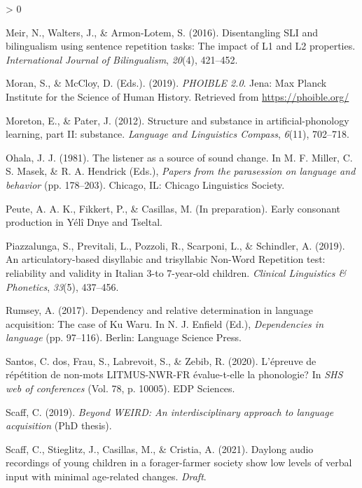 \documentclass[
  american,
  ,man,floatsintext]{apa6}
\newlength{\cslhangindent}
\newenvironment{CSLReferences}[2] %
 {%
  \setlength{\parindent}{0pt}
  \ifodd #1 \everypar{\setlength{\hangindent}{\cslhangindent}}\ignorespaces\fi
  \ifnum #2 > 0
  \setlength{\parskip}{#2\baselineskip}
  \fi
 }%
 {}
\begin{document}
\begin{CSLReferences}{1}{0}
\leavevmode\hypertarget{ref-meir2016disentangling}{}%
Meir, N., Walters, J., \& Armon-Lotem, S. (2016). {Disentangling SLI and bilingualism using sentence repetition tasks: The impact of L1 and L2 properties}. \emph{International Journal of Bilingualism}, \emph{20}(4), 421--452.

\leavevmode\hypertarget{ref-phoible}{}%
Moran, S., \& McCloy, D. (Eds.). (2019). \emph{PHOIBLE 2.0}. Jena: Max Planck Institute for the Science of Human History. Retrieved from \url{https://phoible.org/}

\leavevmode\hypertarget{ref-moreton2012structure}{}%
Moreton, E., \& Pater, J. (2012). Structure and substance in artificial-phonology learning, part {II}: substance. \emph{Language and Linguistics Compass}, \emph{6}(11), 702--718.

\leavevmode\hypertarget{ref-ohala1981listener}{}%
Ohala, J. J. (1981). The listener as a source of sound change. In M. F. Miller, C. S. Masek, \& R. A. Hendrick (Eds.), \emph{Papers from the parasession on language and behavior} (pp. 178--203). Chicago, IL: Chicago Linguistics Society.

\leavevmode\hypertarget{ref-peuteIPconsonants}{}%
Peute, A. A. K., Fikkert, P., \& Casillas, M. (In preparation). Early consonant production in {Y}élî {D}nye and {T}seltal.

\leavevmode\hypertarget{ref-piazzalunga2019articulatory}{}%
Piazzalunga, S., Previtali, L., Pozzoli, R., Scarponi, L., \& Schindler, A. (2019). {An articulatory-based disyllabic and trisyllabic Non-Word Repetition test: reliability and validity in Italian 3-to 7-year-old children}. \emph{Clinical Linguistics \& Phonetics}, \emph{33}(5), 437--456.

\leavevmode\hypertarget{ref-rumsey2017dependency}{}%
Rumsey, A. (2017). Dependency and relative determination in language acquisition: The case of {Ku Waru}. In N. J. Enfield (Ed.), \emph{Dependencies in language} (pp. 97--116). Berlin: Language Science Press.

\leavevmode\hypertarget{ref-dos2020epreuve}{}%
Santos, C. dos, Frau, S., Labrevoit, S., \& Zebib, R. (2020). L'{é}preuve de r{é}p{é}tition de non-mots LITMUS-NWR-FR {é}value-t-elle la phonologie? In \emph{SHS web of conferences} (Vol. 78, p. 10005). EDP Sciences.

\leavevmode\hypertarget{ref-scaff2019}{}%
Scaff, C. (2019). \emph{Beyond {WEIRD}: An interdisciplinary approach to language acquisition} (PhD thesis).

\leavevmode\hypertarget{ref-scaff2021daylong}{}%
Scaff, C., Stieglitz, J., Casillas, M., \& Cristia, A. (2021). Daylong audio recordings of young children in a forager-farmer society show low levels of verbal input with minimal age-related changes. \emph{Draft}.


\end{CSLReferences}
\end{document}
